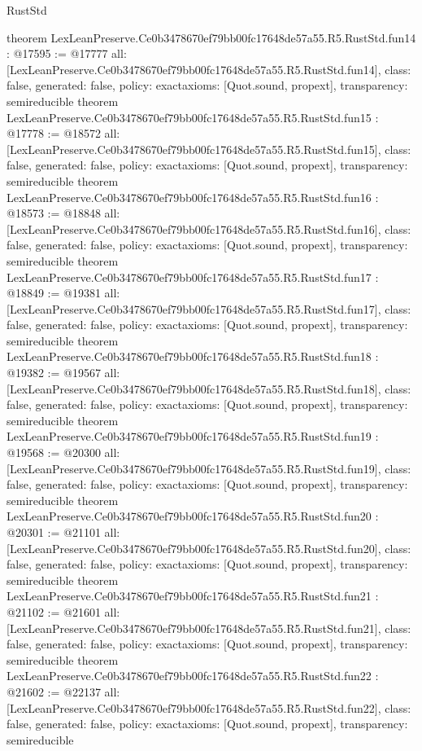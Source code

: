 \begin{lexlean}{RustStd}
\begin{coremodule}
{}
theorem LexLeanPreserve.Ce0b3478670ef79bb00fc17648de57a55.R5.RustStd.fun14 : @17595 := @17777 {
  all: [LexLeanPreserve.Ce0b3478670ef79bb00fc17648de57a55.R5.RustStd.fun14],
  class: false,
  generated: false,
  policy: exact{axioms: [Quot.sound, propext]},
  transparency: semireducible
}
theorem LexLeanPreserve.Ce0b3478670ef79bb00fc17648de57a55.R5.RustStd.fun15 : @17778 := @18572 {
  all: [LexLeanPreserve.Ce0b3478670ef79bb00fc17648de57a55.R5.RustStd.fun15],
  class: false,
  generated: false,
  policy: exact{axioms: [Quot.sound, propext]},
  transparency: semireducible
}
theorem LexLeanPreserve.Ce0b3478670ef79bb00fc17648de57a55.R5.RustStd.fun16 : @18573 := @18848 {
  all: [LexLeanPreserve.Ce0b3478670ef79bb00fc17648de57a55.R5.RustStd.fun16],
  class: false,
  generated: false,
  policy: exact{axioms: [Quot.sound, propext]},
  transparency: semireducible
}
theorem LexLeanPreserve.Ce0b3478670ef79bb00fc17648de57a55.R5.RustStd.fun17 : @18849 := @19381 {
  all: [LexLeanPreserve.Ce0b3478670ef79bb00fc17648de57a55.R5.RustStd.fun17],
  class: false,
  generated: false,
  policy: exact{axioms: [Quot.sound, propext]},
  transparency: semireducible
}
theorem LexLeanPreserve.Ce0b3478670ef79bb00fc17648de57a55.R5.RustStd.fun18 : @19382 := @19567 {
  all: [LexLeanPreserve.Ce0b3478670ef79bb00fc17648de57a55.R5.RustStd.fun18],
  class: false,
  generated: false,
  policy: exact{axioms: [Quot.sound, propext]},
  transparency: semireducible
}
theorem LexLeanPreserve.Ce0b3478670ef79bb00fc17648de57a55.R5.RustStd.fun19 : @19568 := @20300 {
  all: [LexLeanPreserve.Ce0b3478670ef79bb00fc17648de57a55.R5.RustStd.fun19],
  class: false,
  generated: false,
  policy: exact{axioms: [Quot.sound, propext]},
  transparency: semireducible
}
theorem LexLeanPreserve.Ce0b3478670ef79bb00fc17648de57a55.R5.RustStd.fun20 : @20301 := @21101 {
  all: [LexLeanPreserve.Ce0b3478670ef79bb00fc17648de57a55.R5.RustStd.fun20],
  class: false,
  generated: false,
  policy: exact{axioms: [Quot.sound, propext]},
  transparency: semireducible
}
theorem LexLeanPreserve.Ce0b3478670ef79bb00fc17648de57a55.R5.RustStd.fun21 : @21102 := @21601 {
  all: [LexLeanPreserve.Ce0b3478670ef79bb00fc17648de57a55.R5.RustStd.fun21],
  class: false,
  generated: false,
  policy: exact{axioms: [Quot.sound, propext]},
  transparency: semireducible
}
theorem LexLeanPreserve.Ce0b3478670ef79bb00fc17648de57a55.R5.RustStd.fun22 : @21602 := @22137 {
  all: [LexLeanPreserve.Ce0b3478670ef79bb00fc17648de57a55.R5.RustStd.fun22],
  class: false,
  generated: false,
  policy: exact{axioms: [Quot.sound, propext]},
  transparency: semireducible
}
\end{coremodule}
\end{lexlean}
